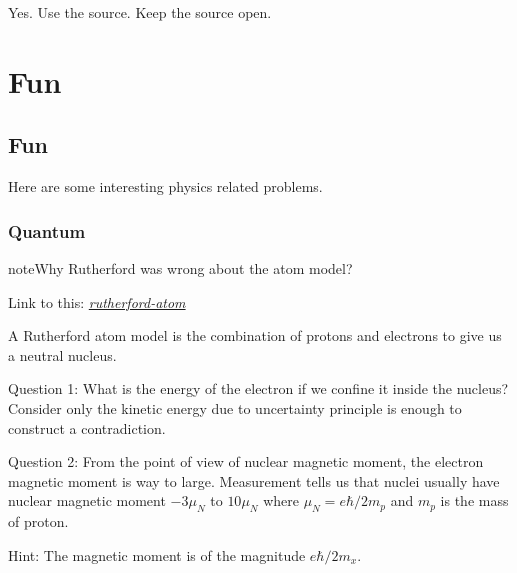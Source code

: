 \documentclass[letterpaper,10pt,english]{sphinxmanual}
\begin{document}
Yes. Use the source. Keep the source open.


\chapter{Fun}
\label{index:fun}

\section{Fun}
\label{fun:fun}\label{fun::doc}
Here are some interesting physics related problems.


\subsection{Quantum}
\label{fun:quantum}
\begin{notice}{note}{Why Rutherford was wrong about the atom model?}

Link to this: {\hyperref[fun:rutherford-atom]{\emph{rutherford-atom}}}

A Rutherford atom model is the combination of protons and electrons to give us a neutral nucleus.

Question 1: What is the energy of the electron if we confine it inside the nucleus? Consider only the kinetic energy due to uncertainty principle is enough to construct a contradiction.

Question 2: From the point of view of nuclear magnetic moment, the electron magnetic moment is way to large. Measurement tells us that nuclei usually have nuclear magnetic moment \(-3\mu_N\) to \(10\mu_N\) where \(\mu_N=e\hbar/2m_p\) and \(m_p\) is the mass of proton.

Hint: The magnetic moment is of the magnitude \(e\hbar/2m_x\).
\end{notice}
\end{document}
